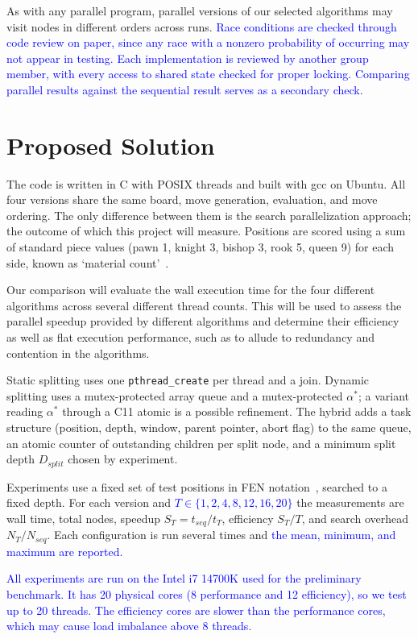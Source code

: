 \documentclass[10pt, conference, compsocconf]{IEEEtran}
\newcommand{\rev}[1]{\textcolor{blue}{#1}}
\begin{document}
As with any parallel program, parallel versions of our selected algorithms may visit nodes in different orders across runs. \rev{Race conditions are checked through code review on paper, since any race with a nonzero probability of occurring may not appear in testing. Each implementation is reviewed by another group member, with every access to shared state checked for proper locking. Comparing parallel results against the sequential result serves as a secondary check.}

\section{Proposed Solution}

The code is written in C with POSIX threads and built with gcc on Ubuntu. All four versions share the same board, move generation, evaluation, and move ordering. The only difference between them is the search parallelization approach; the outcome of which this project will measure. Positions are scored using a sum of standard piece values (pawn 1, knight 3, bishop 3, rook 5, queen 9) for each side, known as `material count'~\cite{shannon1950}.

Our comparison will evaluate the wall execution time for the four different algorithms across several different thread counts. This will be used to assess the parallel speedup provided by different algorithms and determine their efficiency as well as flat execution performance, such as to allude to redundancy and contention in the algorithms.

Static splitting uses one \texttt{pthread\_create} per thread and a join. Dynamic splitting uses a mutex-protected array queue and a mutex-protected $\alpha^{*}$; a variant reading $\alpha^{*}$ through a C11 atomic is a possible refinement. The hybrid adds a task structure (position, depth, window, parent pointer, abort flag) to the same queue, an atomic counter of outstanding children per split node, and a minimum split depth $D_{split}$ chosen by experiment.

Experiments use a fixed set of test positions in FEN notation~\cite{edwards1994}, searched to a fixed depth. For each version and \rev{$T \in \{1, 2, 4, 8, 12, 16, 20\}$} the measurements are wall time, total nodes, speedup $S_T = t_{seq} / t_T$, efficiency $S_T / T$, and search overhead $N_T / N_{seq}$. Each configuration is run several times and \rev{the mean, minimum, and maximum are reported.}

\rev{All experiments are run on the Intel i7 14700K used for the preliminary benchmark. It has 20 physical cores (8 performance and 12 efficiency), so we test up to 20 threads. The efficiency cores are slower than the performance cores, which may cause load imbalance above 8 threads.}
\end{document}
